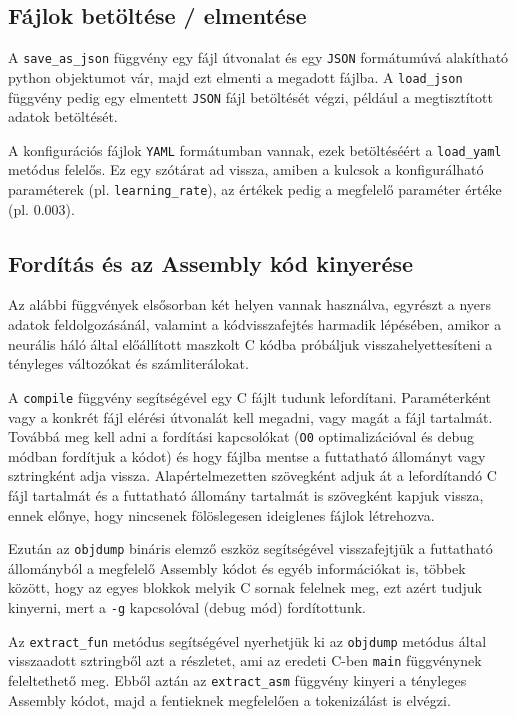 \subsection{Fájlok betöltése / elmentése}
A \texttt{save\_as\_json} függvény egy fájl útvonalat és egy \texttt{JSON}\cite{json}
formátumúvá alakítható python objektumot vár, majd ezt elmenti a megadott fájlba. A \texttt{load\_json}
függvény pedig egy elmentett \texttt{JSON} fájl betöltését végzi, például a megtisztított adatok betöltését.

A konfigurációs fájlok \texttt{YAML}\cite{yaml} formátumban vannak, ezek betöltéséért a \texttt{load\_yaml}
metódus felelős. Ez egy szótárat ad vissza, amiben a kulcsok a konfigurálható paraméterek
(pl. \texttt{learning\_rate}), az értékek pedig a megfelelő paraméter értéke (pl. $0.003$).

\subsection{Fordítás és az Assembly kód kinyerése}
Az alábbi függvények elsősorban két helyen vannak használva, egyrészt a nyers adatok feldolgozásánál,
valamint a kódvisszafejtés harmadik lépésében, amikor a neurális háló által előállított maszkolt C
kódba próbáljuk visszahelyettesíteni a tényleges változókat és számliterálokat.

A \texttt{compile} függvény segítségével egy C fájlt tudunk lefordítani. Paraméterként vagy a konkrét
fájl elérési útvonalát kell megadni, vagy magát a fájl tartalmát. Továbbá meg kell adni a fordítási
kapcsolókat (\texttt{O0} optimalizációval és debug módban fordítjuk a kódot)
és hogy fájlba mentse a futtatható állományt vagy sztringként adja vissza. Alapértelmezetten
szövegként adjuk át a lefordítandó C fájl tartalmát és a futtatható állomány tartalmát is szövegként kapjuk
vissza, ennek előnye, hogy nincsenek fölöslegesen ideiglenes fájlok létrehozva.

Ezután az \texttt{objdump} bináris elemző eszköz segítségével visszafejtjük a futtatható állományból
a megfelelő Assembly kódot és egyéb információkat is, többek között, hogy az egyes blokkok melyik C
sornak felelnek meg, ezt azért tudjuk kinyerni, mert a \texttt{-g} kapcsolóval (debug mód) fordítottunk.

Az \texttt{extract\_fun} metódus segítségével nyerhetjük ki az \texttt{objdump} metódus által visszaadott
sztringből azt a részletet, ami az eredeti C-ben \texttt{main} függvénynek feleltethető meg. Ebből aztán az
\texttt{extract\_asm} függvény kinyeri a tényleges Assembly kódot, majd a fentieknek megfelelően
a tokenizálást is elvégzi.

